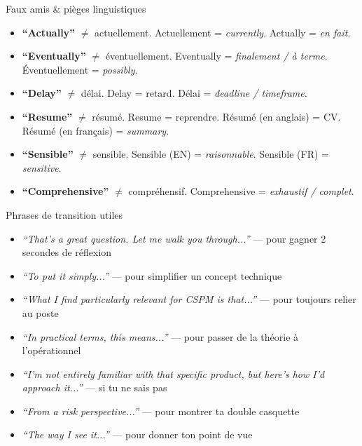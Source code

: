 \documentclass[11pt,a4paper]{article}
\begin{document}
\vspace{6pt}

\begin{warnbox}{Faux amis \& pi\`eges linguistiques}
\begin{itemize}[nosep, leftmargin=12pt]
\item \textbf{``Actually''} $\neq$ actuellement. Actuellement = \textit{currently}.
      Actually = \textit{en fait}.
\item \textbf{``Eventually''} $\neq$ \'eventuellement. Eventually = \textit{finalement / \`a terme}.
      \'Eventuellement = \textit{possibly}.
\item \textbf{``Delay''} $\neq$ d\'elai. Delay = retard. D\'elai = \textit{deadline / timeframe}.
\item \textbf{``Resume''} $\neq$ r\'esum\'e. Resume = reprendre. R\'esum\'e (en anglais) = CV.
      R\'esum\'e (en fran\c{c}ais) = \textit{summary}.
\item \textbf{``Sensible''} $\neq$ sensible. Sensible (EN) = \textit{raisonnable}.
      Sensible (FR) = \textit{sensitive}.
\item \textbf{``Comprehensive''} $\neq$ compr\'ehensif. Comprehensive = \textit{exhaustif / complet}.
\end{itemize}
\end{warnbox}

\vspace{6pt}

\begin{goodbox}{Phrases de transition utiles}
\begin{itemize}[nosep, leftmargin=12pt]
\item \textit{``That's a great question. Let me walk you through...''}
      --- pour gagner 2 secondes de r\'eflexion
\item \textit{``To put it simply...''} --- pour simplifier un concept technique
\item \textit{``What I find particularly relevant for CSPM is that...''}
      --- pour toujours relier au poste
\item \textit{``In practical terms, this means...''}
      --- pour passer de la th\'eorie \`a l'op\'erationnel
\item \textit{``I'm not entirely familiar with that specific product, but
      here's how I'd approach it...''} --- si tu ne sais pas
\item \textit{``From a risk perspective...''} --- pour montrer ta double casquette
\item \textit{``The way I see it...''} --- pour donner ton point de vue
\end{itemize}
\end{goodbox}
\end{document}
